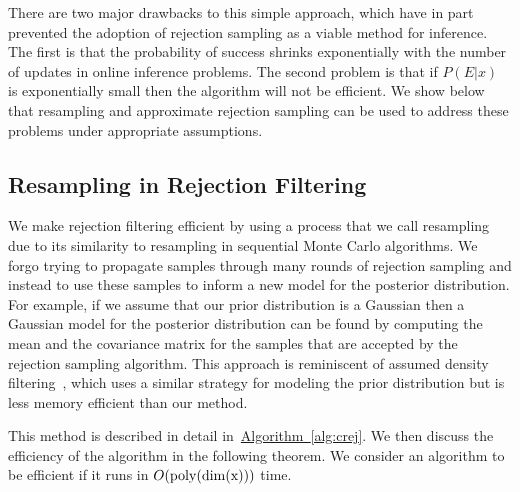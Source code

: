 \documentclass[twoside]{article}
\newcommand{\alg}[1]{\hyperref[alg:#1]{Algorithm~\ref*{alg:#1}}}
\begin{document}
There are two major drawbacks to this simple approach, which have in part prevented the adoption
of rejection sampling as a viable method for inference.  The first is that the probability of success shrinks exponentially with the number of updates
in online inference problems.
The second problem is that if $P(E|x)$ is exponentially small then the algorithm will not be efficient.
We show below that resampling and approximate rejection sampling can be used to address 
 these problems under appropriate assumptions.

\subsection{Resampling in Rejection Filtering}
We make rejection filtering efficient by using a process that we call resampling due to
its similarity to resampling in sequential Monte Carlo algorithms.  We
forgo trying to propagate samples through many rounds of rejection sampling and instead
to use these samples to inform a new model for the posterior distribution.  For example, if
we assume that our prior distribution is a Gaussian then a Gaussian model for the posterior
distribution can be found by computing the mean and the covariance matrix for the samples
that are accepted by the rejection sampling algorithm.  This approach is
reminiscent of assumed density filtering~\cite{minka_expectation_2001}, which uses a similar strategy
for modeling the prior distribution but is less memory efficient than
our method.





This method is described in detail in~\alg{crej}. We then discuss the efficiency of the algorithm in the following theorem.
We consider an algorithm to be efficient if it runs in $O(\rm{poly}({\rm dim}(x)))$ time.


\end{document}
